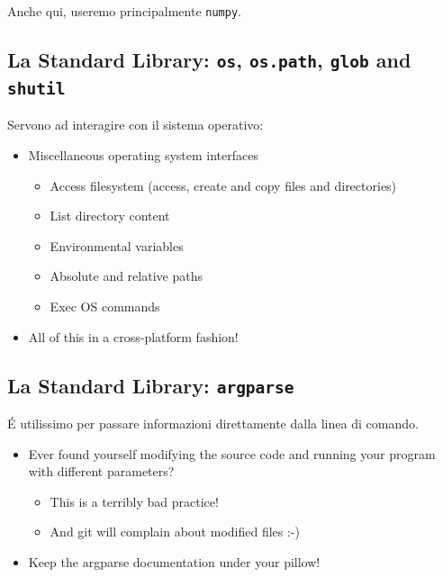 Anche qui, useremo principalmente \texttt{numpy}.

\subsection{La Standard Library: \texttt{os}, \texttt{os.path}, \texttt{glob} and
    \texttt{shutil}}
Servono ad interagire con il sistema operativo:

\begin{itemize}
  \item Miscellaneous operating system interfaces
    \begin{itemize}
    \item Access filesystem (access, create and copy files and directories)
    \item List directory content
    \item Environmental variables
    \item Absolute and relative paths
    \item Exec OS commands
    \end{itemize}
  \item All of this in a cross-platform fashion!
  \end{itemize}

\subsection{La Standard Library: \texttt{argparse}}
\'E utilissimo per passare informazioni direttamente dalla linea di comando.
\begin{itemize}
  \item Ever found yourself modifying the source code and running your program with different parameters?
    \begin{itemize}
    \item This is a terribly bad practice!
    \item And git will complain about modified files :-)
    \end{itemize}
  \item Keep the argparse documentation under your pillow!
  \end{itemize}
    
    
